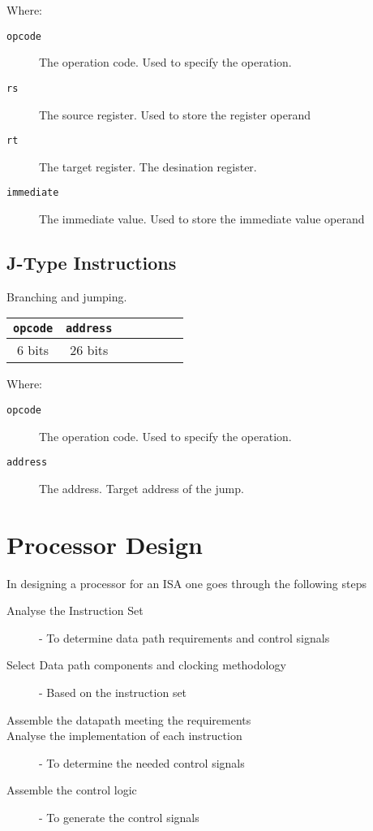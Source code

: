 \documentclass[12pt letter]{report}
\begin{document}
Where:
\begin{description}
  \item[\texttt{opcode}] The operation code. Used to specify the operation.
  \item[\texttt{rs}] The source register. Used to store the register operand
  \item[\texttt{rt}] The target register. The desination register.
  \item [\texttt{immediate}] The immediate value. Used to store the immediate value operand
\end{description}

\section{J-Type Instructions}

Branching and jumping.

\begin{table}[h!]
  \begin{center}
    \begin{tabular}{|c|c|c|c|c|c|c|}
      \hline
      \texttt{opcode} & \texttt{address} \\
      \hline
      6 bits          & 26 bits          \\
      \hline
    \end{tabular}
  \end{center}
\end{table}

Where:
\begin{description}
  \item[\texttt{opcode}] The operation code. Used to specify the operation.
  \item[\texttt{address}] The address. Target address of the jump.
\end{description}

\chapter{Processor Design}

In designing a processor for an ISA one goes through the following steps
\begin{description}
  \item[Analyse the Instruction Set ] - To determine data path requirements and control signals
  \item[Select Data path components and clocking methodology] - Based on the instruction set
  \item[Assemble the datapath meeting the requirements]
  \item[Analyse the implementation of each instruction] - To determine the needed control signals
  \item[Assemble the control logic] - To generate the control signals
\end{description}
\end{document}
